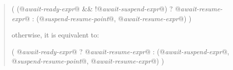 \begin{quote}
\begin{codeblock}
  (
  (@\textit{await-ready-expr}@ && !@\textit{await-suspend-expr}@) ? @\textit{await-resume-expr}@
  : (@\textit{suspend-resume-point}@, @\textit{await-resume-expr}@)
  )
\end{codeblock}
otherwise, it is equivalent to:

\begin{codeblock}
  (
  @\textit{await-ready-expr}@ ? @\textit{await-resume-expr}@
  : (@\textit{await-suspend-expr}@, @\textit{suspend-resume-point}@, @\textit{await-resume-expr}@)
  )
\end{codeblock}


%  

\end{quote}
